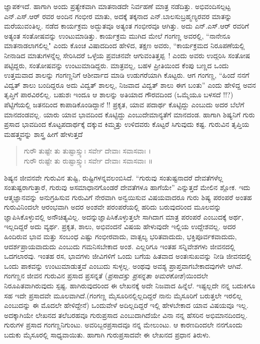 {ಜ್ಞಾಪಕ\-ಇದೆ. ಹಾಗಾಗಿ ಅಂದು ಪ್ರತ್ಯೇಕವಾಗಿ ಮಾತನಾಡದೇ ನಿರ್ವಹಣೆ ಮಾತ್ರ ನಡೆದಿತ್ತು. ಅಭಿವಂದಿಸಲ್ಪಟ್ಟ ಎನ್.ಎಸ್.ಆರ್ ರವರ ಅಂದಿನ ಗಂಭೀರ ಮಾತು, ಅದಕ್ಕೆ \hbox{ತಕ್ಕನಾದ} ಎನ್.ಬಾಲಸುಬ್ರಹ್ಮಣ್ಯರವರ ಮಾತನ್ನು ಮರೆಯುವಂತಿಲ್ಲ. ನಡೆದ ಕಾರ್ಯಕ್ರಮ ಅದ್ಭುತವೂ ಅತ್ಯಂತ \hbox{ಗಂಭೀರವೂ} ಆಗಿತ್ತು. ಅದು ಎನ್.ಎಸ್.ಆರ್ \hbox{ರವರಿಗೆ} ಅತ್ಯಂತ ಸಂತೋಷವನ್ನು \hbox{ಉಂಟುಮಾಡಿತ್ತು.} ಕಾರ್ಯಕ್ರಮ ಮುಗಿದ ಮೇಲೆ ಗಂಗಣ್ಣ \hbox{ಅವರಲ್ಲಿ,} “ನಾನೇನೂ \hbox{ಮಾತನಾಡಲಾಗಲಿಲ್ಲ"} ಎಂದು ಕೊಂಚ ವಿಷಾದದಿಂದ ಹೇಳಿದ, ತಕ್ಷಣ ಅವರು, “ಕಾರ್ಯಕ್ರಮದ ನಿರೂಪಣೆಯಲ್ಲಿ ನೀನಾಡಿದ ಮಾತುಗಳನ್ನೆಲ್ಲ \hbox{ಸೇರಿಸಿದರೆ} ಒಳ್ಳೆಯ ಪ್ರವಚನವೇ \hbox{ಆಗುವಂತಿತ್ತಪ್ಪ~!} ಎಂದು ಅವರು \hbox{ಉದ್ಗರಿಸಿ} ಸಂತೋಷ ಪಟ್ಟಿದ್ದರು, ಸಂತೋಷವನ್ನು \hbox{ಉಂಟುಮಾಡಿದ್ದರು.} ಮಾತ್ರವಲ್ಲ, ಬಹಳ ಪ್ರೀತಿಯಿಂದ \hbox{ಕೆಂಪು} ಬಣ್ಣದ ಒಂದು ಉತ್ತಮವಾದ \hbox{ಶಾಲನ್ನು} ಗಂಗಣ್ಣನಿಗೆ ಆಶೀರ್ವಾದ ಮಾಡಿ \hbox{ಉಡುಗರೆಯಾಗಿ} \hbox{ಕೊಟ್ಟರು.} ಆಗ ಗಂಗಣ್ಣ, “ಹಿಂದೆ ನನಗೆ ವಿದ್ವತ್ ಶಾಲು \hbox{ಬಂದಿದ್ದರೂ} ಅದು ವಿದ್ವತ್ ಶಾಲಲ್ಲ, ನಿಜವಾದ ವಿದ್ವತ್ ಶಾಲು ಈಗ  ಬಂತು” ಎಂದು ಹೇಳಿದ್ದ \enginline{-} ಅವನ ತೃಪ್ತಿಗೆ ಪಾರವಿರಲಿಲ್ಲ. ಬಹುಶಃ ಇಂದೂ ಆ \hbox{ಶಾಲನ್ನು} \hbox{ಅತಿಯಾದ} ಗೌರವದಿಂದ {(ಒಮ್ಮೆಯೂ ಬಳಸದೆ !!?)} ಪೆಟ್ಟಿಗೆಯಲ್ಲಿ \hbox{ಜತನದಿಂದ} ಕಾಪಾಡಿಕೊಂಡಿದ್ದಾನೆ !! ಪ್ರಕೃತ, ಯಾವ ಪದಾರ್ಥ ಕೊಟ್ಟಿದ್ದು ಎಂಬುದು ಅದರ ಬೆಲೆಗೆ ಮಾನದಂಡವಲ್ಲ. ಯಾರು ಯಾವ ಭಾವದಿಂದ ಕೊಟ್ಟಿದ್ದು ಎಂಬುದೇ\break ಮಾನ್ಯತೆಗೆ ಮಾನದಂಡ. ಹಾಗಾಗಿ ಶಿಷ್ಯನಿಗೆ ಗುರು ಪ್ರಸಾದ ಭಾವದಿಂದ ಕೊಟ್ಟ\break ಪದಾರ್ಥಕ್ಕೆ ದಕ್ಕುವ ಕಿಮ್ಮತ್ತು ಉಳಿದವರು ಕೊಟ್ಟರೆ ಸಿಗುವುದು ಕಷ್ಟ. 
ಗುರುವಿನ ತೃಪ್ತಿಯ ಮಹತ್ತ್ವವನ್ನು ಶಾಸ್ತ್ರ ಹೀಗೆ ಹೇಳುತ್ತದೆ \enginline{-} 
\begin{verse}
ಗುರೌ ತುಷ್ಟೇ ತು ತುಷ್ಟಾಸ್ಸ್ಯುಃ ಸರ್ವೇ ದೇವಾಃ ಸವಾಸವಾಃ  ।\\ 
ಗುರೌ ರುಷ್ಟೇ ತು ರುಷ್ಟಾಸ್ಸ್ಯುಃ ಸರ್ವೇ ದೇವಾಃ ಸವಾಸವಾಃ ॥
\end{verse}
ಶಿಷ್ಯನ ಜೀವನವೇ ಗುರುವಿನ ತುಷ್ಟಿ, ರುಷ್ಟಿಗಳನ್ನವಲಂಬಿಸಿದೆ. “ಗುರುವು ಸಂತುಷ್ಟ\-ನಾದರೆ ದೇವತೆಗಳೆಲ್ಲ ಸಂತುಷ್ಟರಾಗುತ್ತಾರೆ, ಗುರುವು ಅಸಮಾಧಾನಗೊಂಡರೆ ದೇವತೆ\-ಗಳೂ ಹಾಗೆಯೇ” ಎನ್ನುತ್ತದೆ ಮೇಲಿನ ಶ್ಲೋಕ. ಇದು ಆತ್ಮಜ್ಞಾನವನ್ನು ಅನುಗ್ರಹಿಸುವ ಗುರುವಿಗೆ ನೇರವಾಗಿ ಅನ್ವಯಿಸುವ ವಿಷಯವಾದರೂ ಗುರು ಶಿಷ್ಯ \hbox{ಪರಂಪರೆ} ಅಂತಹ ಗುರುವಿನಿಂದಲೇ ಆರಂಭವಾಗಿ ಅದರ ಅಂಶವೇ ಪರಂಪರೆಯಲ್ಲಿ \hbox{ಹರಿದು} ಬರುವುದರಿಂದ  ಮೂಲವನ್ನು ಜ್ಞಾಪಿಸಿಕೊಳ್ಳುವಲ್ಲಿ ಅನೌಚಿತ್ಯವಿಲ್ಲ. ಅದನ್ನು\break ಜ್ಞಾಪಿಸಿಕೊಳ್ಳುತ್ತಲೇ ಸಾಗಿದಾಗ ಮಾತ್ರ ಪರಂಪರೆ ಎಂಬುದಕ್ಕೆ ಅರ್ಥ, ಇಲ್ಲದಿದ್ದರೆ ಅದು ವ್ಯರ್ಥ. ಪ್ರಕೃತ, ಶಾಲು, ಅಭಿವಂದನೆ ವಿಷಯ ಹೇಳುವುದೇ ಇಲ್ಲಿಯ ಉದ್ದೇಶವಲ್ಲ. ಅದರ ಹಿಂದಿರುವ ಭಾವ ಮತ್ತು ಸಂಬಂಧ ಎಷ್ಟು ಗಂಭೀರವಾದು, ವಾತ್ಸಲ್ಯ ಭರಿತ\-ವಾದುದು, ಭಕ್ತಿ\-ಪೂರ್ವಕವಾದುದು, ಆದರ್ಶಪ್ರಾಯವಾದುದು ಎಂಬುದು ಗಮನಿಸಬೇಕಾದ ಅಂಶ. ಎಲ್ಲರಿಗೂ ಇಂತಹ ಸನ್ನಿವೇಶಗಳು ಜೀವನದಲ್ಲಿ ಒದಗಲಾರವು. ಇಂತಹ ರಸ, ಭಾವಗಳು ಜೀವಿಗಳಿಗೆ ಒಂದು ಬಗೆಯ ಹಿತವಾದ \hbox{ಅಂತಃಸುಖವನ್ನು} ನೀಡಿ  ಜೀವನದಲ್ಲಿ ಒಂದು ಪಾಕವನ್ನು ಉಂಟುಮಾಡುತ್ತವೆ ಎಂಬುದು ಸುಳ್ಳಲ್ಲ. \hbox{ಅಂಥವು} ಅವಶ್ಯ ಪ್ರಾಪ್ತವಾಗಬೇಕಾದವುಗಳೇ ಆಗಿವೆ. ಗಂಗಣ್ಣನ ಜೀವನ ಗುರುವಿನ ಪ್ರಸಾದ \enginline{-} ಪ್ರಸನ್ನತೆ (\textit{ಪ್ರಸಾದಸ್ತು ಪ್ರಸನ್ನತಾ \enginline{-} ಅಮರಕೋಶ})ಯಿಂದಲೇ ನಿರೂಪಿತ\-ವಾಗಿರು\-ವುದು ಸ್ಪಷ್ಟ. ಹಾಗಿರುವುದರಿಂದ ಈ ಲೇಖನಕ್ಕೆ ಅದೇ ನಿಜವಾದ ಹಿನ್ನೆಲೆ. \hbox{ಇಷ್ಟಲ್ಲದೇ} ನನ್ನ ಬದುಕಿಗೂ ಸಹ ಇದೇ ಪ್ರಸಾದವೇ ಮೂಲವಾಗಿದೆ.(ಗಂಗಣ್ಣ ಮೈಸೂರಿನಲ್ಲಿಲ್ಲದಿದ್ದರೆ ನಾನು ಮೈಸೂರಿಗೆ ಬರುತ್ತಲೇ ಇರಲಿಲ್ಲ ಎಂಬುದನ್ನು ಈ ಮೊದಲೇ \hbox{ಹೇಳಿದ್ದೇನೆ}) ಒಂದುವೇಳೆ ಅದಿಲ್ಲದಿದ್ದರೆ ಇಲ್ಲಿ ಹೇಳಬೇಕಾದ ಯಾವ ವಿಷಯವೂ ಇಲ್ಲ. ಅದಕ್ಕಾಗಿಯೇ ಲೇಖನದ ತಲೆ\-ಬರಹವೂ ಗುರುಪ್ರಸಾದ ಎಂಬುದಾಗಿದೆಯೇ ವಿನಾ ನನ್ನ \hbox{ಹೆಸರಿನ} ಅಭಿಮಾನದಿಂದಲ್ಲ. ಗುರುಗಳ ಪ್ರಸಾದ ಗಂಗಣ್ಣನಿಗುಂಟು. ಅವರಿಬ್ಬರ\break ಪ್ರಸಾದವೂ ನನ್ನ ಮೇಲುಂಟು. ಆ ಕಾರಣದಿಂದಲೇ ನನಗೊಂದು ಬದುಕು \hbox{ಮೈಸೂರಲ್ಲಿ} ಸಾಧ್ಯವಾಯಿತು. ಹಾಗಾಗಿ ಗುರು\enginline{-}ಪ್ರಸಾದವೇ ಈ ಲೇಖನದ ಪ್ರಧಾನ ತಿರುಳು. 

}
